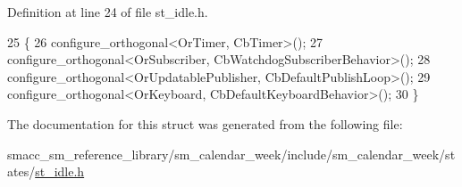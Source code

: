 Definition at line 24 of file st\+\_\+idle.\+h.


\begin{DoxyCode}
25     \{
26         configure\_orthogonal<OrTimer, CbTimer>();   
27         configure\_orthogonal<OrSubscriber, CbWatchdogSubscriberBehavior>();
28         configure\_orthogonal<OrUpdatablePublisher, CbDefaultPublishLoop>();
29         configure\_orthogonal<OrKeyboard, CbDefaultKeyboardBehavior>();
30     \}
\end{DoxyCode}


The documentation for this struct was generated from the following file\+:\begin{DoxyCompactItemize}
\item 
smacc\+\_\+sm\+\_\+reference\+\_\+library/sm\+\_\+calendar\+\_\+week/include/sm\+\_\+calendar\+\_\+week/states/\hyperlink{sm__calendar__week_2include_2sm__calendar__week_2states_2st__idle_8h}{st\+\_\+idle.\+h}\end{DoxyCompactItemize}
